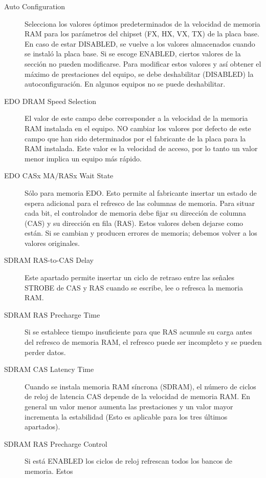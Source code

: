 			\begin{description}
				\item[Auto Configuration] Selecciona los valores óptimos
					predeterminados de la velocidad de memoria RAM para los
					parámetros del chipset (FX, HX, VX, TX) de la placa base.
					En caso de estar DISABLED, se vuelve a los valores
					almacenados cuando se instaló la placa base. Si se escoge
					ENABLED, ciertos valores de la sección no pueden
					modificarse. Para modificar estos valores y así obtener el
					máximo de prestaciones del equipo, se debe deshabilitar
					(DISABLED) la autoconfiguración. En algunos equipos no se
					puede deshabilitar.
				\item[EDO DRAM Speed Selection] El valor de este campo debe
					corresponder a la velocidad de la memoria RAM instalada en
					el equipo. NO cambiar los valores por defecto de este campo
					que han sido determinados por el fabricante de la placa
					para la RAM instalada. Este valor es la velocidad de
					acceso, por lo tanto un valor menor implica un equipo más
					rápido.
				\item[EDO CASx MA/RASx Wait State] Sólo para memoria EDO.
					Esto permite al fabricante insertar un estado de espera
					adicional para el refresco de las columnas de memoria. Para
					situar cada bit, el controlador de memoria debe fijar su
					dirección de columna (CAS) y su dirección en fila (RAS).
					Estos valores deben dejarse como están. Si se cambian y
					producen errores de memoria; debemos volver a los valores
					originales.
				\item[SDRAM RAS-to-CAS Delay] Este apartado permite insertar un
					ciclo de retraso entre las señales STROBE de CAS y RAS
					cuando se escribe, lee o refresca la memoria RAM.
				\item[SDRAM RAS Precharge Time] Si se establece tiempo
					insuficiente para que RAS acumule su carga antes del
					refresco de memoria RAM, el refresco puede ser incompleto y
					se pueden perder datos.
				\item[SDRAM CAS Latency Time] Cuando se instala memoria RAM
					síncrona (SDRAM), el número de ciclos de reloj de latencia
					CAS depende de la velocidad de memoria RAM. En general un
					valor menor aumenta las prestaciones y un valor mayor
					incrementa la estabilidad (Esto es aplicable para los tres
					últimos apartados).
				\item[SDRAM RAS Precharge Control] Si está ENABLED los ciclos
					de reloj refrescan todos los bancos de memoria. Estos

\end{description}
